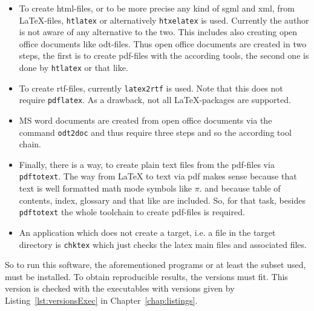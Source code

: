 \documentclass[12pt]{book}
\newcommand{\gls}[1]{#1}
\renewcommand{\index}[1]{ }
\begin{document}
\begin{itemize}
****
\item
To create \gls{html}-files, 
or to be more precise any kind of \gls{sgml} and \gls{xml}, 
from \LaTeX-files, \texttt{htlatex} or alternatively \texttt{htxelatex} is used. 
Currently the author is not aware of any alternative to the two. 
This includes also creating open office documents like odt-files. 
Thus open office documents are created in two steps, 
the first is to create pdf-files with the according tools, 
the second one is done by \texttt{htlatex} or that like. 
\index{htlatex}\index{htxelatex}
\item
To create rtf-files, currently \texttt{latex2rtf} is used. 
Note that this does not require \texttt{pdflatex}. 
As a drawback, not all \LaTeX-packages are supported. 
\index{latex2rtf}
\item
MS word documents are created from open office documents 
via the command \texttt{odt2doc} and thus require three steps 
and so the according tool chain. 
\index{odt2doc} 
\item
Finally, there is a way, to create plain text files from the pdf-files 
via \texttt{pdftotext}. 
The way from \LaTeX{} to text via pdf makes sense 
because that text is well formatted math mode symbols like $\pi$. 
and because table of contents, index, glossary and that like are included. 
So, for that task, besides \texttt{pdftotext} the whole toolchain to create
pdf-files is required. 
\index{pdftotext}
\item
An application which does not create a target, 
i.e. a file in the target directory is \texttt{chktex} 
which just checks the latex main files and associated files. 
\end{itemize}

So to run this software, the aforementioned programs 
or at least the subset used, must be installed.
To obtain reproducible results, the versions must fit.
This version is checked with the executables with versions given by
Listing~\ref{lst:versionsExec} in Chapter~\ref{chap:listings}.

\end{document}
